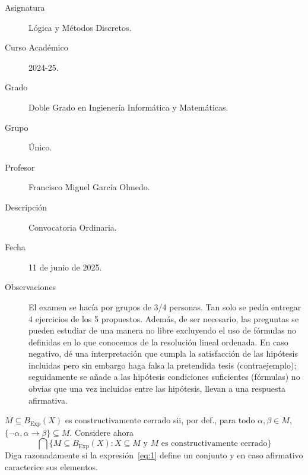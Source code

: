 \documentclass[12pt]{article}
\DeclareMathOperator{\Exp}{Exp}
\begin{document}

    
    
    \vspace{-2cm}
    \begin{description}
        \item[Asignatura] Lógica y Métodos Discretos.
        \item[Curso Académico] 2024-25.
        \item[Grado] Doble Grado en Ingienería Informática y Matemáticas.
        \item[Grupo] Único.
        \item[Profesor] Francisco Miguel García Olmedo.
        \item[Descripción] Convocatoria Ordinaria.
        \item[Fecha] 11 de junio de 2025.
        \item[Observaciones] El examen se hacía por grupos de 3/4 personas. Tan solo se pedía entregar 4 ejercicios de los 5 propuestos. Además, de ser necesario, las preguntas se pueden estudiar de una manera no libre excluyendo el uso de fórmulas no definidas en lo que conocemos de la resolución lineal ordenada. En caso negativo, dé una interpretación que cumpla la satisfacción de las hipótesis incluidas pero sin embargo haga falsa la pretendida tesis (contraejemplo); seguidamente se añade a las hipótesis condiciones suficientes (fórmulas) no obvias que una vez incluidas entre las hipótesis, llevan a una respuesta afirmativa.
    \end{description}
    \newpage



\begin{ejercicio}
    $M \subseteq B_{\Exp}(X)$ es constructivamente cerrado sii, por def., para todo $\alpha, \beta \in M$, $\{\neg \alpha, \alpha \rightarrow \beta\} \subseteq M$.
    Considere ahora
    \begin{equation}\label{eq:1}
        \bigcap \{M \subseteq B_{\Exp}(X): X \subseteq M \text{ y } M \text{ es constructivamente cerrado}\}
    \end{equation}
    Diga razonadamente si la expresión~\eqref{eq:1} define un conjunto y en caso afirmativo caracterice sus elementos.
\end{ejercicio}
\end{document}
